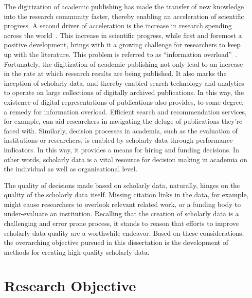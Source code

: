 The digitization of academic publishing has made the transfer of new knowledge into the research community faster, thereby enabling an acceleration of scientific progress. A second driver of acceleration is the increase in research spending across the world~\cite{CRS2022,OECD2023}.
This increase in scientific progress, while first and foremost a positive development, brings with it a growing challenge for researchers to keep up with the literature. This problem is referred to as ``information overload''~\cite{Landhuis2016}.
Fortunately, the digitization of academic publishing not only lead to %
an increase in the rate at which research results are being published. It also marks the inception of scholarly data, and thereby enabled search technology and analytics to operate on large collections of digitally archived publications.
In this way, the existence of digital representations of publications also provides, to some degree, a remedy for information overload. Efficient search and recommendation services, for example, can aid researchers in navigating the deluge of publications they're faced with.
Similarly, decision processes in academia, such as the evaluation of institutions or researchers, is enabled by scholarly data through performance indicators. In this way, it provides a means for hiring and funding decisions.
In other words, scholarly data is a vital resource for decision making in academia on the individual as well as organisational level.

The quality of decisions made based on scholarly data, naturally, hinges on the quality of the scholarly data itself. Missing citation links in the data, for example, might cause researchers to overlook relevant related work, or a funding body to under-evaluate an institution. Recalling that the creation of scholarly data is a challenging and error prone process, it stands to reason that efforts to improve scholarly data quality are a worthwhile endeavor. Based on these considerations, the overarching objective pursued in this dissertation is the development of methods for creating high-quality scholarly data.


\section{Research Objective}\label{sec:intro-researchobj}

